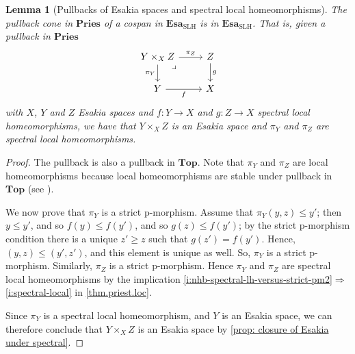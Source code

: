 \documentclass[12pt]{amsart}
\theoremstyle{plain}
\newtheorem{lemma}[theorem]{Lemma}
\theoremstyle{definition}
\newcommand{\cat}[1]{\mathbf{#1}}
\newcommand{\Top}{\cat{Top}}
\newcommand{\Esa}{\cat{Esa}}
\newcommand{\Pries}{\cat{Pries}}
\newcommand{\SLH}{\mathrm{SLH}}
\begin{document}
\begin{lemma}[Pullbacks of Esakia spaces and spectral local homeomorphisms] \label{l:pullback}
    The pullback cone in $\Pries$ of a cospan in $\Esa_\SLH$ is in $\Esa_\SLH$.
    That is, given a pullback in $\Pries$
    \[
        \begin{tikzcd}
        	{Y\times_X Z}\arrow[dr, phantom, very near start, "\lrcorner"] & Z \\
        	Y & X
        	\arrow["{\pi_Z}", from=1-1, to=1-2]
        	\arrow["{\pi_Y}"', from=1-1, to=2-1]
        	\arrow["g", from=1-2, to=2-2]
        	\arrow["f"', from=2-1, to=2-2]
        \end{tikzcd}
    \]
    with $X$, $Y$ and $Z$ Esakia spaces and 
    $f \colon Y \to X$ and $g \colon Z \to X$ spectral local homeomorphisms, we have that $Y\times_X Z$ is an Esakia space and $\pi_Y$ and $\pi_Z$ are spectral local homeomorphisms.
\end{lemma}

\begin{proof}
    The pullback is also a pullback in $\Top$.
    Note that $\pi_Y$ and $\pi_Z$ are local homeomorphisms because local homeomorphisms are stable under pullback in $\Top$ (see \cite[Example~A.1.2.7]{johnstone2002sketches}).

    
    We now prove that $\pi_Y$ is a strict p-morphism.
    Assume that $\pi_{Y}(y,z)\leq y'$; then $y\leq y'$, and so $f(y)\leq f(y')$, and so $g(z)\leq f(y')$; by the strict p-morphism condition there is a unique $z'\geq z$ such that $g(z')=f(y')$. Hence, $(y,z)\leq (y',z')$, and this element is unique as well. So, $\pi_{Y}$ is a strict p-morphism. Similarly, $\pi_Z$ is a strict p-morphism.  Hence $\pi_Y$ and $\pi_Z$ are spectral local homeomorphisms by the implication \eqref{i:nhb-spectral-lh-versus-strict-pm2}$\Rightarrow$\eqref{i:spectral-local} in \cref{thm.priest.loc}.

    Since $\pi_{Y}$ is a spectral local homeomorphism, and $Y$ is an Esakia space, we can therefore conclude that $Y\times_{X}Z$ is an Esakia space by \cref{prop: closure of Esakia under spectral}.
\end{proof}
\end{document}
